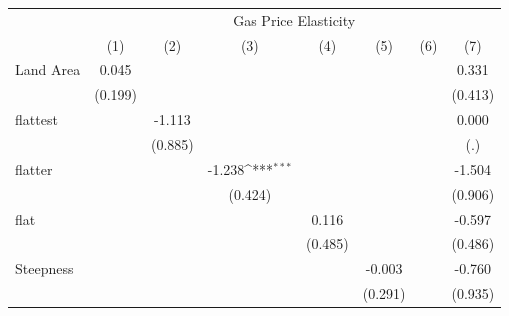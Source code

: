 {
\def\sym#1{\ifmmode^{#1}\else\(^{#1}\)\fi}
\begin{tabular}{l*{7}{c}}
\hline\hline
            &\multicolumn{7}{c}{Gas Price Elasticity}                                                                                                                 \\
            &\multicolumn{1}{c}{(1)}         &\multicolumn{1}{c}{(2)}         &\multicolumn{1}{c}{(3)}         &\multicolumn{1}{c}{(4)}         &\multicolumn{1}{c}{(5)}         &\multicolumn{1}{c}{(6)}         &\multicolumn{1}{c}{(7)}         \\
\hline
Land Area   &       0.045         &                     &                     &                     &                     &                     &       0.331         \\
            &     (0.199)         &                     &                     &                     &                     &                     &     (0.413)         \\
[1em]
flattest    &                     &      -1.113         &                     &                     &                     &                     &       0.000         \\
            &                     &     (0.885)         &                     &                     &                     &                     &         (.)         \\
[1em]
flatter     &                     &                     &      -1.238\sym{***}&                     &                     &                     &      -1.504         \\
            &                     &                     &     (0.424)         &                     &                     &                     &     (0.906)         \\
[1em]
flat        &                     &                     &                     &       0.116         &                     &                     &      -0.597         \\
            &                     &                     &                     &     (0.485)         &                     &                     &     (0.486)         \\
[1em]
Steepness   &                     &                     &                     &                     &      -0.003         &                     &      -0.760         \\
            &                     &                     &                     &                     &     (0.291)         &                     &     (0.935)         \\

\end{tabular}}
